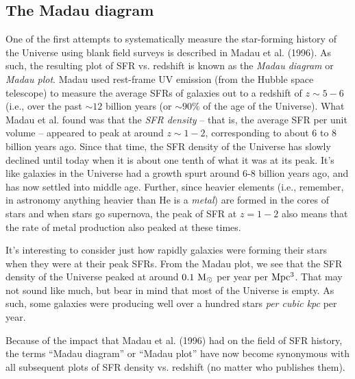 \documentclass[11pt]{article}
\begin{document}
\subsection{The Madau diagram}
One of the first attempts to systematically measure the star-forming
history of the Universe using blank field surveys is described in
Madau et al. (1996). As such, the resulting plot of SFR vs. redshift
is known as the {\it Madau diagram} or {\it Madau plot}. Madau used
rest-frame UV emission (from the Hubble space telescope) to measure
the average SFRs of galaxies out to a redshift of $z\sim5-6$ (i.e.,
over the past $\sim12$ billion years (or $\sim90\%$ of the age of the
Universe). What Madau et al. found was that the {\it SFR density} --
that is, the average SFR per unit volume -- appeared to peak at around
$z\sim1-2$, corresponding to about 6 to 8 billion years ago. Since
that time, the SFR density of the Universe has slowly declined until
today when it is about one tenth of what it was at its peak. It's like
galaxies in the Universe had a growth spurt around 6-8 billion years ago,
and has now settled into middle age. Further, since heavier elements
(i.e., remember, in astronomy anything heavier than He is a {\it
  metal}) are formed in the cores of stars and when stars go
supernova, the peak of SFR at $z=1-2$ also means that the rate of
metal production also peaked at these times.

It's interesting to consider just how rapidly galaxies were forming
their stars when they were at their peak SFRs. From the Madau plot, we
see that the SFR density of the Universe peaked at around
$0.1~{\rm M_\odot}$ per year per ${\rm Mpc^3}$. That may not sound
like much, but bear in mind that most of the Universe is empty. As
such, some galaxies were producing well over a hundred stars {\it per
  cubic kpc} per year.

Because of the impact that Madau et al. (1996) had on the field of SFR
history, the terms ``Madau diagram'' or ``Madau plot'' have now become
synonymous with all subsequent plots of SFR density vs. redshift (no
matter who publishes them).
\end{document}
